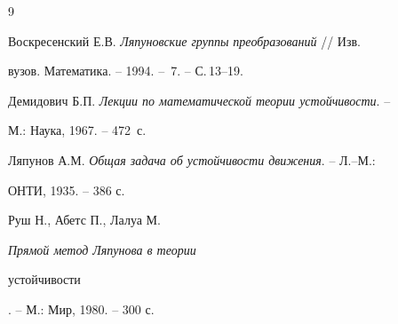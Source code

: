  


\begin{thebibliography}{9} 


 




Воскресенский Е.В. {\em Ляпуновские группы преобразований} // Изв. 


вузов. Математика. -- 1994. -- \No\,7. -- С.\,13--19. 




Демидович Б.П. {\em Лекции по математической теории устойчивости}. -- 


М.: Наука, 1967. -- 472~с. 




Ляпунов А.М. {\em Общая задача об устойчивости движения}. -- Л.--М.: 


ОНТИ, 1935. -- 386 с. 




Руш Н., Абетс П., Лалуа М. {\em Прямой метод Ляпунова в теории 


устойчивости}. -- М.: Мир, 1980. -- 300 с. 


 


\end{thebibliography} 


 


\vskip 0.5cm 


 








 


\label{end} 


 


